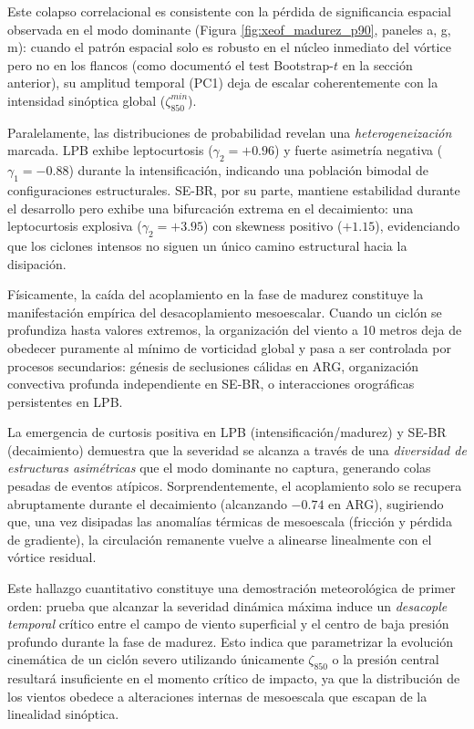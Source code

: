 Este colapso correlacional es consistente con la pérdida de significancia espacial observada en el modo dominante (Figura \ref{fig:xeof_madurez_p90}, paneles a, g, m): cuando el patrón espacial solo es robusto en el núcleo inmediato del vórtice pero no en los flancos (como documentó el test Bootstrap-$t$ en la sección anterior), su amplitud temporal (PC1) deja de escalar coherentemente con la intensidad sinóptica global ($\zeta_{850}^{min}$).



Paralelamente, las distribuciones de probabilidad revelan una \textit{heterogeneización} marcada. LPB exhibe leptocurtosis ($\gamma_2 = +0.96$) y fuerte asimetría negativa ($\gamma_1 = -0.88$) durante la intensificación, indicando una población bimodal de configuraciones estructurales. SE-BR, por su parte, mantiene estabilidad durante el desarrollo pero exhibe una bifurcación extrema en el decaimiento: una leptocurtosis explosiva ($\gamma_2 = +3.95$) con skewness positivo ($+1.15$), evidenciando que los ciclones intensos no siguen un único camino estructural hacia la disipación.

Físicamente, la caída del acoplamiento en la fase de madurez constituye la manifestación empírica del desacoplamiento mesoescalar. Cuando un ciclón se profundiza hasta valores extremos, la organización del viento a 10 metros deja de obedecer puramente al mínimo de vorticidad global y pasa a ser controlada por procesos secundarios: génesis de seclusiones cálidas en ARG, organización convectiva profunda independiente en SE-BR, o interacciones orográficas persistentes en LPB. 

La emergencia de curtosis positiva en LPB (intensificación/madurez) y SE-BR (decaimiento) demuestra que la severidad se alcanza a través de una \textit{diversidad de estructuras asimétricas} que el modo dominante no captura, generando colas pesadas de eventos atípicos. Sorprendentemente, el acoplamiento solo se recupera abruptamente durante el decaimiento (alcanzando $-0.74$ en ARG), sugiriendo que, una vez disipadas las anomalías térmicas de mesoescala (fricción y pérdida de gradiente), la circulación remanente vuelve a alinearse linealmente con el vórtice residual.



Este hallazgo cuantitativo constituye una demostración meteorológica de primer orden: prueba que alcanzar la severidad dinámica máxima induce un \textit{desacople temporal} crítico entre el campo de viento superficial y el centro de baja presión profundo durante la fase de madurez. Esto indica que parametrizar la evolución cinemática de un ciclón severo utilizando únicamente $\zeta_{850}$ o la presión central resultará insuficiente en el momento crítico de impacto, ya que la distribución de los vientos obedece a alteraciones internas de mesoescala que escapan de la linealidad sinóptica. 

